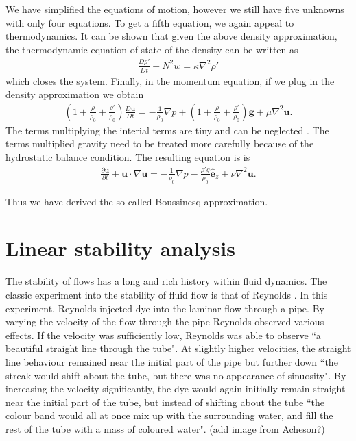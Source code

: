 We have simplified the equations of motion, however we still have five unknowns with only four equations. To get a fifth equation, we again appeal to thermodynamics. It can be shown that given the above density approximation, the thermodynamic equation of state of the density \cite{vallis} can be written as
\begin{align}
\frac{D\rho'}{Dt} - N^{2}w = \kappa \nabla^{2} \rho'
\end{align}
which closes the system. Finally, in the momentum equation, if we plug in the density approximation we obtain
\begin{align} 
\left(1 + \frac{\bar{\rho}}{\rho_{0}} + \frac{\rho'}{\rho_{0}}\right)\frac{D\bm{u}}{Dt} = -\frac{1}{\rho_{0}}\nabla p + \left(1 + \frac{\bar{\rho}}{\rho_{0}} + \frac{\rho'}{\rho_{0}}\right)\textbf{g} + \mu \nabla^{2}\bm{u}.
\end{align}
The terms multiplying the interial terms are tiny and can be neglected \cite{kundu}. The terms multiplied gravity need to be treated more carefully because of the hydrostatic balance condition. The resulting equation is \cite{kundu,vallis} is
\begin{align} 
\frac{\partial \bm{u}}{\partial t} + \bm{u}\cdot \nabla \bm{u} = -\frac{1}{\rho_{0}}\nabla p - \frac{\rho' g}{\rho_{0}}\hat{\bm{e}}_{z} + \nu \nabla^{2}\bm{u}.
\end{align}

Thus we have derived the so-called Boussinesq approximation. 

\section{Linear stability analysis}
The stability of flows has a long and rich history within fluid dynamics. The classic experiment into the stability of fluid flow is that of  Reynolds \cite{reynolds1883}. In this experiment, Reynolds injected dye into the laminar flow through a pipe. By varying the velocity of the flow through the pipe Reynolds observed various effects. If the velocity was sufficiently low, Reynolds was able to observe ``a beautiful straight line through the tube". At slightly higher velocities, the straight line behaviour remained near the initial part of the pipe but further down ``the streak would shift about the tube, but there was no appearance of sinuosity". By increasing the velocity significantly, the dye would again initially remain straight near the initial part of the tube, but instead of shifting about the tube ``the colour band would all at once mix up with the surrounding water, and fill the rest of the tube with a mass of coloured water". (add image from Acheson?)

